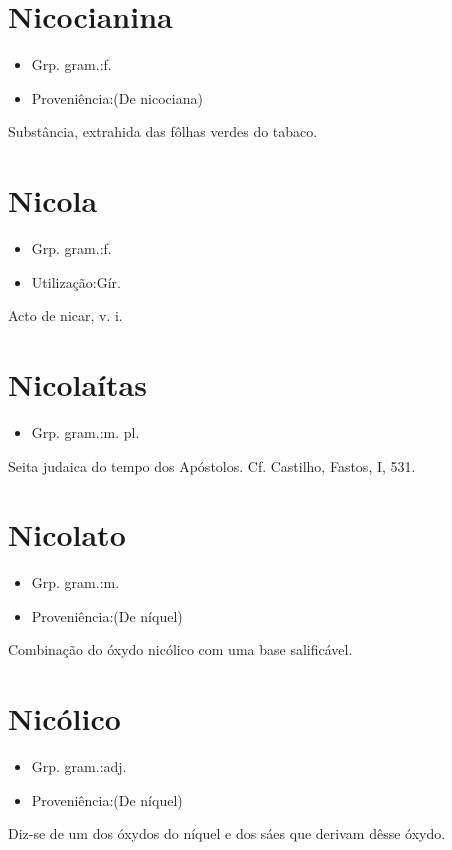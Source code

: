 \section{Nicocianina}
\begin{itemize}
\item {Grp. gram.:f.}
\end{itemize}
\begin{itemize}
\item {Proveniência:(De \textunderscore nicociana\textunderscore )}
\end{itemize}
Substância, extrahida das fôlhas verdes do tabaco.
\section{Nicola}
\begin{itemize}
\item {Grp. gram.:f.}
\end{itemize}
\begin{itemize}
\item {Utilização:Gír.}
\end{itemize}
Acto de nicar, \textunderscore v. i.\textunderscore 
\section{Nicolaítas}
\begin{itemize}
\item {Grp. gram.:m. pl.}
\end{itemize}
Seita judaica do tempo dos Apóstolos. Cf. Castilho, \textunderscore Fastos\textunderscore , I, 531.
\section{Nicolato}
\begin{itemize}
\item {Grp. gram.:m.}
\end{itemize}
\begin{itemize}
\item {Proveniência:(De \textunderscore níquel\textunderscore )}
\end{itemize}
Combinação do óxydo nicólico com uma base salificável.
\section{Nicólico}
\begin{itemize}
\item {Grp. gram.:adj.}
\end{itemize}
\begin{itemize}
\item {Proveniência:(De \textunderscore níquel\textunderscore )}
\end{itemize}
Diz-se de um dos óxydos do níquel e dos sáes que derivam dêsse óxydo.
